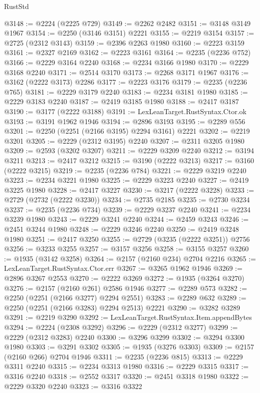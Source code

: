 \begin{lexlean}{RustStd}
\begin{coremodule}
@3148 := @2224 (@2225 @729)
@3149 := @2262 @2482
@3151 := @3148 @3149 @1967
@3154 := @2250 (@3146 @3151) @2221
@3155 := @2219 @3154
@3157 := @2725 (@2312 @3143)
@3159 := @2396 @2263 @1980
@3160 := @2223 @3159
@3161 := @2327 @2169
@3162 := @2223 @3161
@3164 := @2235 (@2236 @752)
@3166 := @2229 @3164 @2240
@3168 := @2234 @3166 @1980
@3170 := @2229 @3168 @2240
@3171 := @2514 @3170
@3173 := @2268 @3171 @1967
@3176 := @3162 (@2222 @3173) @2286
@3177 := @2223 @3176
@3179 := @2235 (@2236 @765)
@3181 := @2229 @3179 @2240
@3183 := @2234 @3181 @1980
@3185 := @2229 @3183 @2240
@3187 := @2419 @3185 @1980
@3188 := @2417 @3187
@3190 := @3177 (@2222 @3188)
@3191 := LexLeanTarget.RustSyntax.Ctor.ok
@3193 := @3191 @1962 @1946
@3194 := @2896 @3193
@3195 := @2289 @556
@3201 := @2250 (@2251 (@2166 @3195) @2294 @3161) @2221
@3202 := @2219 @3201
@3205 := @2229 (@2312 @3195) @2240
@3207 := @2311 @3205 @1980
@3209 := @2593 (@3202 @3207)
@3211 := @2229 @3209 @2240
@3212 := @3194 @3211
@3213 := @2417 @3212
@3215 := @3190 (@2222 @3213)
@3217 := @3160 (@2222 @3215)
@3219 := @2235 (@2236 @784)
@3221 := @2229 @3219 @2240
@3223 := @2234 @3221 @1980
@3225 := @2229 @3223 @2240
@3227 := @2419 @3225 @1980
@3228 := @2417 @3227
@3230 := @3217 (@2222 @3228)
@3233 := @2729 (@2732 (@2222 @3230))
@3234 := @2735 @2185
@3235 := @2730 @3234
@3237 := @2235 (@2236 @734)
@3239 := @2229 @3237 @2240
@3241 := @2234 @3239 @1980
@3243 := @2229 @3241 @2240
@3244 := @2459 @3243
@3246 := @2451 @3244 @1980
@3248 := @2229 @3246 @2240
@3250 := @2419 @3248 @1980
@3251 := @2417 @3250
@3255 := @2729 (@3235 (@2222 @3251)) @2756
@3256 := @3233 @3255
@3257 := @3157 @3256
@3258 := @3155 @3257
@3260 := @1935 (@3142 @3258)
@3264 := @2157 (@2160 @234) @2704 @2216
@3265 := LexLeanTarget.RustSyntax.Ctor.err
@3267 := @3265 @1962 @1946
@3269 := @2896 @3267 @2553
@3270 := @2222 @3269
@3272 := @1935 (@3264 @3270)
@3276 := @2157 (@2160 @261) @2586 @1946
@3277 := @2289 @573
@3282 := @2250 (@2251 (@2166 @3277) @2294 @2551)
@3283 := @2289 @632
@3289 := @2250 (@2251 (@2166 @3283) @2294 @2513) @2221
@3290 := @3282 @3289
@3291 := @2219 @3290
@3292 := LexLeanTarget.RustSyntax.Item.appendBytes
@3294 := @2224 (@2308 @3292)
@3296 := @2229 (@2312 @3277)
@3299 := @2229 (@2312 @3283) @2240
@3300 := @3296 @3299
@3302 := @3294 @3300 @1980
@3303 := @3291 @3302
@3305 := @1935 (@3276 @3303)
@3309 := @2157 (@2160 @266) @2704 @1946
@3311 := @2235 (@2236 @815)
@3313 := @2229 @3311 @2240
@3315 := @2234 @3313 @1980
@3316 := @2229 @3315
@3317 := @3316 @2240
@3318 := @2552 @3317
@3320 := @2451 @3318 @1980
@3322 := @2229 @3320 @2240
@3323 := @3316 @3322

\end{coremodule}
\end{lexlean}
